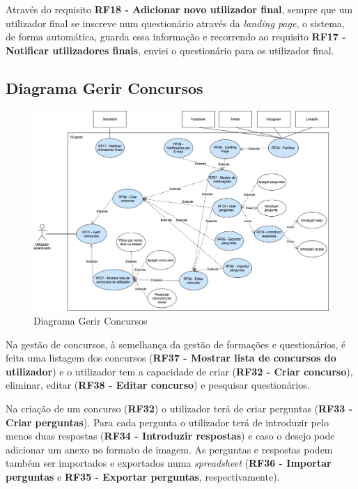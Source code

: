 Através do requisito \textbf{RF18 - Adicionar novo utilizador final}, sempre que um utilizador final se inscreve num questionário através da \textit{landing page}, o sistema, de forma automática, guarda essa informação e recorrendo ao requisito \textbf{RF17 - Notificar utilizadores finais}, enviei o questionário para os utilizador final.


\subsection{Diagrama Gerir Concursos}
\label{d:concursos}
\begin{figure}[ht!]
	\begin{center}
		\includegraphics[width=1\textwidth]{img/rf/gerir-concurso}
		\caption{Diagrama Gerir Concursos}
		\label{fig:rf-gerir-concursos}
	\end{center}
\end{figure}


Na gestão de concursos, à semelhança da gestão de formações e questionários, é feita uma listagem dos concursos (\textbf{RF37 - Mostrar lista de concursos do utilizador}) e o utilizador tem a capacidade de criar (\textbf{RF32 - Criar concurso}), eliminar, editar (\textbf{RF38 - Editar concurso}) e pesquisar questionários.

Na criação de um concurso (\textbf{RF32}) o utilizador terá de criar perguntas (\textbf{RF33 - Criar perguntas}). Para cada pergunta o utilizador terá de introduzir pelo menos duas respostas (\textbf{RF34 - Introduzir respostas}) e caso o desejo pode adicionar um anexo no formato de imagem. As perguntas e respostas podem também ser importados e exportados numa \textit{spreadsheet} (\textbf{RF36 - Importar perguntas} e \textbf{RF35 - Exportar perguntas}, respectivamente).

